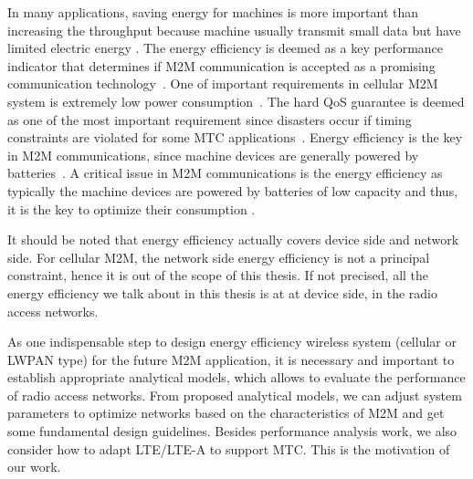 In many applications, saving energy for machines is more important than increasing the throughput because machine usually transmit small data but have limited electric energy \cite{YuanHo12}. The energy efficiency is deemed as a key performance indicator that determines if M2M communication is accepted as a promising communication technology~\cite{lu11GRS}. One of important requirements in cellular M2M system is extremely low power consumption~\cite{IEEE/802.16p/10/0002r7}. The hard QoS guarantee is deemed as one of the most important requirement since disasters occur if timing constraints are violated for some MTC applications~\cite{SYLien11}. Energy efficiency is the key in M2M communications, since machine devices are generally powered by batteries~\cite{Costa14}. A critical issue in M2M communications is the energy efficiency as typically the machine devices are powered by batteries of low capacity and thus, it is the key to optimize their consumption \cite{Costa14}.

It should be noted that energy efficiency actually covers device side and network side. For cellular M2M, the network side energy efficiency is not a principal constraint, hence it is out of the scope of this thesis. If not precised, all the energy efficiency we talk about in this thesis is at at device side, in the radio access networks.

As one indispensable step to design energy efficiency wireless system (cellular or LWPAN type) for the future M2M application, it is necessary and important to establish appropriate analytical models, which allows to evaluate the performance of radio access networks. From proposed analytical models, we can adjust system parameters to optimize networks based on the characteristics of M2M and get some fundamental design guidelines. Besides performance analysis work, we also consider how to adapt LTE/LTE-A to support MTC. This is the motivation of our work.








